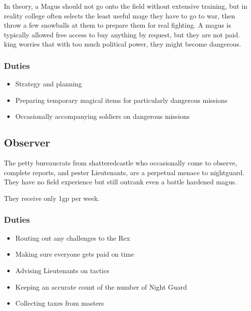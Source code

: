 \begin{multicols}{2}
In theory, a Magus should not go onto the field without extensive training, but in reality \gls{college} often selects the least useful mage they have to go to war, then throw a few snowballs at them to prepare them for real fighting.
A magus is typically allowed free access to buy anything by request, but they are not paid.
\Gls{king} worries that with too much political power, they might become dangerous.

\subsubsection{Duties}

\begin{itemize}

	\item{Strategy and planning}
	\item{Preparing temporary magical items for particularly dangerous missions}
	\item{Occasionally accompanying soldiers on dangerous missions}

\end{itemize}

\subsection{Observer}

The petty bureaucrats from \gls{shatteredcastle} who occasionally come to observe, complete reports, and pester Lieutenants, are a perpetual menace to \gls{nightguard}.
They have no field experience but still outrank even a battle hardened magus.

They receive only 1gp per week.

\subsubsection{Duties}

\begin{itemize}

	\item{Routing out any challenges to the Rex}
	\item{Making sure everyone gets paid on time}
	\item{Advising Lieutenants on tactics}
	\item{Keeping an accurate count of the number of Night Guard}
	\item{Collecting taxes from masters}

\end{itemize}


\end{multicols}
